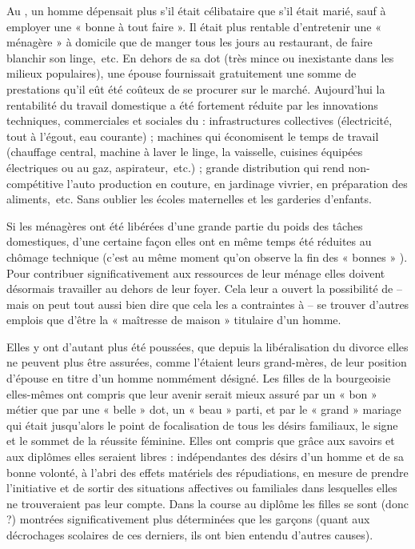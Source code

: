 Au , un homme dépensait plus s'il était célibataire que s'il était marié, sauf à employer une « bonne à tout faire ». Il était plus rentable d'entretenir une « ménagère » à domicile que de manger tous les jours au restaurant, de faire blanchir son linge,~etc. En dehors de sa dot (très mince ou inexistante dans les milieux populaires), une épouse fournissait gratuitement une somme de prestations qu'il eût été coûteux de se procurer sur le marché. Aujourd'hui la rentabilité du travail domestique a été fortement réduite par les innovations techniques, commerciales et sociales du  : infrastructures collectives (électricité, tout à l'égout, eau courante) ; machines qui économisent le temps de travail (chauffage central, machine à laver le linge, la vaisselle, cuisines équipées électriques ou au gaz, aspirateur,~etc.) ; grande distribution qui rend non-compétitive l'auto production en couture, en jardinage vivrier, en préparation des aliments,~etc. Sans oublier les écoles maternelles et les garderies d'enfants. 

 Si les ménagères ont été libérées d'une grande partie du poids des tâches domestiques, d'une certaine façon elles ont en même temps été réduites au chômage technique (c'est au même moment qu'on observe la fin des « bonnes » ). Pour contribuer significativement aux ressources de leur ménage elles doivent désormais travailler au dehors de leur foyer. Cela leur a ouvert la possibilité de -- mais on peut tout aussi bien dire que cela les a contraintes à -- se trouver d'autres emplois que d'être la « maîtresse de maison » titulaire d'un homme. 

 Elles y ont d'autant plus été poussées, que depuis la libéralisation du divorce elles ne peuvent plus être assurées, comme l'étaient leurs grand-mères, de leur position d'épouse en titre d'un homme nommément désigné. Les filles de la bourgeoisie elles-mêmes ont compris que leur avenir serait mieux assuré par un « bon » métier que par une « belle » dot, un « beau » parti, et par le « grand » mariage qui était jusqu'alors le point de focalisation de tous les désirs familiaux, le signe et le sommet de la réussite féminine. Elles ont compris que grâce aux savoirs et aux diplômes elles seraient libres : indépendantes des désirs d'un homme et de sa bonne volonté, à l'abri des effets matériels des répudiations, en mesure de prendre l'initiative et de sortir des situations affectives ou familiales dans lesquelles elles ne trouveraient pas leur compte. Dans la course au diplôme les filles se sont (donc ?) montrées significativement plus déterminées que les garçons (quant aux décrochages scolaires de ces derniers, ils ont bien entendu d'autres causes). 

